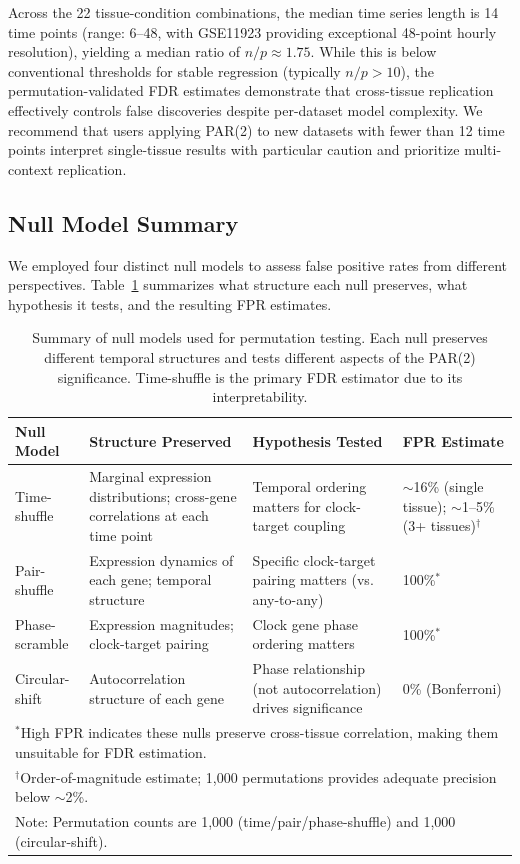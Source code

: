 \documentclass[11pt,a4paper]{article}
\begin{document}
Across the 22 tissue-condition combinations, the median time series length is 14 time points (range: 6--48, with GSE11923 providing exceptional 48-point hourly resolution), yielding a median ratio of $n/p \approx 1.75$. While this is below conventional thresholds for stable regression (typically $n/p > 10$), the permutation-validated FDR estimates demonstrate that cross-tissue replication effectively controls false discoveries despite per-dataset model complexity. We recommend that users applying PAR(2) to new datasets with fewer than 12 time points interpret single-tissue results with particular caution and prioritize multi-context replication.

\subsection{Null Model Summary}
\label{sec:null_models}

We employed four distinct null models to assess false positive rates from different perspectives. Table~\ref{tab:null_summary} summarizes what structure each null preserves, what hypothesis it tests, and the resulting FPR estimates.

\begin{table}[H]
\centering
\caption{Summary of null models used for permutation testing. Each null preserves different temporal structures and tests different aspects of the PAR(2) significance. Time-shuffle is the primary FDR estimator due to its interpretability.}
\label{tab:null_summary}
\begin{tabular}{p{2.5cm}p{3.5cm}p{4cm}p{2.5cm}}
\toprule
Null Model & Structure Preserved & Hypothesis Tested & FPR Estimate \\
\midrule
Time-shuffle & Marginal expression distributions; cross-gene correlations at each time point & Temporal ordering matters for clock-target coupling & $\sim$16\% (single tissue); $\sim$1--5\% (3+ tissues)$^{\dagger}$ \\
\addlinespace
Pair-shuffle & Expression dynamics of each gene; temporal structure & Specific clock-target pairing matters (vs. any-to-any) & 100\%$^*$ \\
\addlinespace
Phase-scramble & Expression magnitudes; clock-target pairing & Clock gene phase ordering matters & 100\%$^*$ \\
\addlinespace
Circular-shift & Autocorrelation structure of each gene & Phase relationship (not autocorrelation) drives significance & 0\% (Bonferroni) \\
\bottomrule
\multicolumn{4}{l}{\small $^*$High FPR indicates these nulls preserve cross-tissue correlation, making them unsuitable for FDR estimation.} \\
\multicolumn{4}{l}{\small $^{\dagger}$Order-of-magnitude estimate; 1,000 permutations provides adequate precision below $\sim$2\%.} \\
\multicolumn{4}{l}{\small Note: Permutation counts are 1,000 (time/pair/phase-shuffle) and 1,000 (circular-shift).}
\end{tabular}
\end{table}
\end{document}
